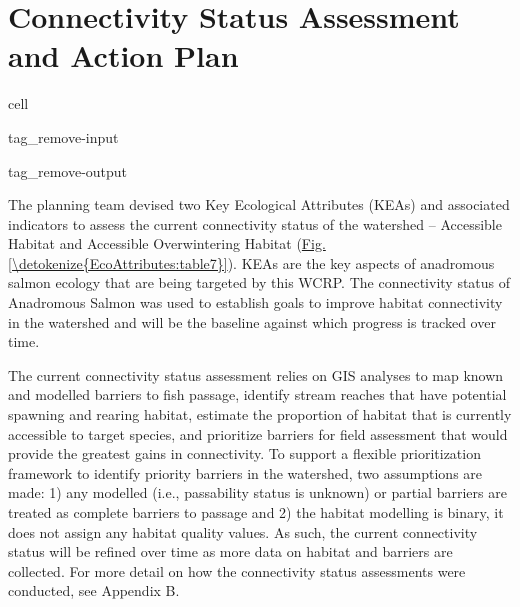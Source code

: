 \documentclass[letterpaper,10pt,english]{jupyterBook}
\begin{document}
\chapter{Connectivity Status Assessment and Action Plan}
\label{\detokenize{EcoAttributes:connectivity-status-assessment-and-action-plan}}\label{\detokenize{EcoAttributes::doc}}
\begin{sphinxuseclass}{cell}
\begin{sphinxuseclass}{tag_remove-input}
\begin{sphinxuseclass}{tag_remove-output}
\end{sphinxuseclass}
\end{sphinxuseclass}
\end{sphinxuseclass}
\sphinxAtStartPar
The planning team devised two Key Ecological Attributes (KEAs) and associated indicators to assess the current connectivity status of the watershed – Accessible Habitat and Accessible Overwintering Habitat (\hyperref[\detokenize{EcoAttributes:table7}]{Fig.\@ \ref{\detokenize{EcoAttributes:table7}}}). KEAs are the key aspects of anadromous salmon ecology that are being targeted by this WCRP. The connectivity status of Anadromous Salmon was used to establish goals to improve habitat connectivity in the watershed and will be the baseline against which progress is tracked over time.

\sphinxAtStartPar
The current connectivity status assessment relies on GIS analyses to map known and modelled barriers to fish passage, identify stream reaches that have potential spawning and rearing habitat, estimate the proportion of habitat that is currently accessible to target species, and prioritize barriers for field assessment that would provide the greatest gains in connectivity. To support a flexible prioritization framework to identify priority barriers in the watershed, two assumptions are made: 1) any modelled (i.e., passability status is unknown) or partial barriers are treated as complete barriers to passage and 2) the habitat modelling is binary, it does not assign any habitat quality values. As such, the current connectivity status will be refined over time as more data on habitat and barriers are collected. For more detail on how the connectivity status assessments were conducted, see Appendix B.
\end{document}
